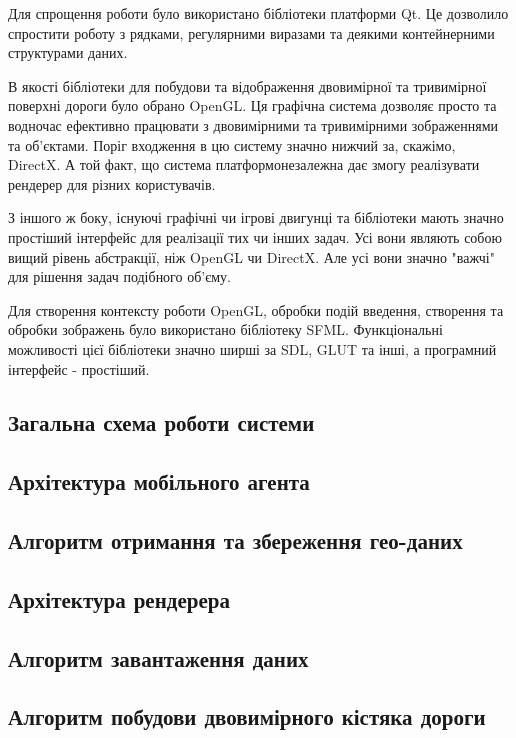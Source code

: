 \documentclass[simple,a4paper,14pt,ukrainian,utf8]{eskdtext}
\begin{document}
        Для спрощення роботи було використано бібліотеки платформи Qt. Це дозволило спростити роботу з рядками, регулярними виразами та деякими контейнерними структурами даних.
        
        В якості бібліотеки для побудови та відображення двовимірної та тривимірної поверхні дороги було обрано OpenGL. Ця графічна система дозволяє просто та водночас ефективно працювати з двовимірними та тривимірними зображеннями та об’єктами. Поріг входження в цю систему значно нижчий за, скажімо, DirectX. А той факт, що система платформонезалежна дає змогу реалізувати рендерер для різних користувачів.
        
        З іншого ж боку, існуючі графічні чи ігрові двигунці та бібліотеки мають значно простіший інтерфейс для реалізації тих чи інших задач. Усі вони являють собою вищий рівень абстракції, ніж OpenGL чи DirectX. Але усі вони значно "важчі" для рішення задач подібного об’єму.
        
        Для створення контексту роботи OpenGL, обробки подій введення, створення та обробки зображень було використано бібліотеку SFML. Функціональні можливості цієї бібліотеки значно ширші за SDL, GLUT та інші, а програмний інтерфейс - простіший.

    \subsection{Загальна схема роботи системи}

	\subsection{Архітектура мобільного агента}
        
    \subsection{Алгоритм отримання та збереження гео-даних}

    \subsection{Архітектура рендерера}

	\subsection{Алгоритм завантаження даних}
	
	\subsection{Алгоритм побудови двовимірного кістяка дороги}
	
\end{document}

